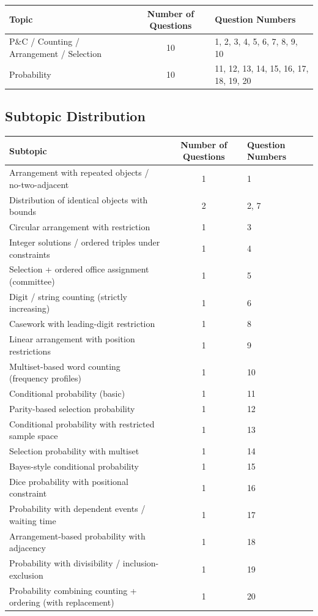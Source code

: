\documentclass[11pt]{article}
\begin{document}
\begin{tabular}{|l|c|l|}
\hline
\textbf{Topic} & \textbf{Number of Questions} & \textbf{Question Numbers} \\
\hline
P\&C / Counting / Arrangement / Selection & 10 & 1, 2, 3, 4, 5, 6, 7, 8, 9, 10 \\
\hline
Probability & 10 & 11, 12, 13, 14, 15, 16, 17, 18, 19, 20 \\
\hline
\end{tabular}

\subsection*{Subtopic Distribution}

\begin{longtable}{|l|c|l|}
\hline
\textbf{Subtopic} & \textbf{Number of Questions} & \textbf{Question Numbers} \\
\hline
Arrangement with repeated objects / no-two-adjacent & 1 & 1 \\
\hline
Distribution of identical objects with bounds & 2 & 2, 7 \\
\hline
Circular arrangement with restriction & 1 & 3 \\
\hline
Integer solutions / ordered triples under constraints & 1 & 4 \\
\hline
Selection + ordered office assignment (committee) & 1 & 5 \\
\hline
Digit / string counting (strictly increasing) & 1 & 6 \\
\hline
Casework with leading-digit restriction & 1 & 8 \\
\hline
Linear arrangement with position restrictions & 1 & 9 \\
\hline
Multiset-based word counting (frequency profiles) & 1 & 10 \\
\hline
Conditional probability (basic) & 1 & 11 \\
\hline
Parity-based selection probability & 1 & 12 \\
\hline
Conditional probability with restricted sample space & 1 & 13 \\
\hline
Selection probability with multiset & 1 & 14 \\
\hline
Bayes-style conditional probability & 1 & 15 \\
\hline
Dice probability with positional constraint & 1 & 16 \\
\hline
Probability with dependent events / waiting time & 1 & 17 \\
\hline
Arrangement-based probability with adjacency & 1 & 18 \\
\hline
Probability with divisibility / inclusion-exclusion & 1 & 19 \\
\hline
Probability combining counting + ordering (with replacement) & 1 & 20 \\
\hline
\end{longtable}
\end{document}
